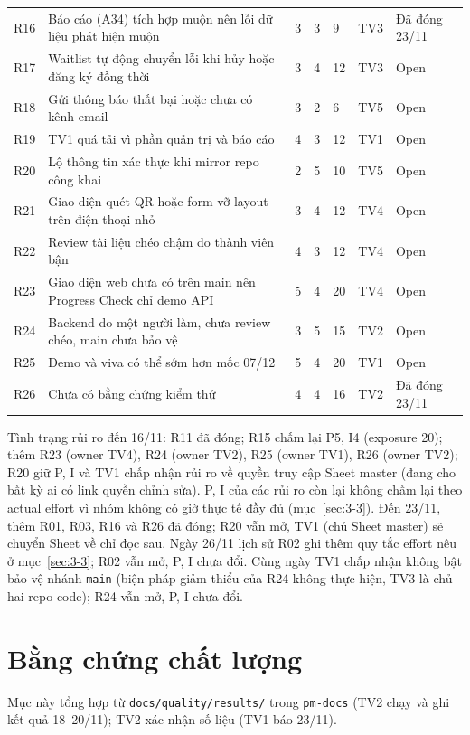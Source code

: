 \begin{longtable}{L{0.9cm}L{6.4cm}L{0.6cm}L{0.6cm}L{1.0cm}L{1.4cm}L{3.0cm}}
R16 & Báo cáo (A34) tích hợp muộn nên lỗi dữ liệu phát hiện muộn & 3 & 3 & 9 & TV3 & Đã đóng 23/11 \\
R17 & Waitlist tự động chuyển lỗi khi hủy hoặc đăng ký đồng thời & 3 & 4 & 12 & TV3 & Open \\
R18 & Gửi thông báo thất bại hoặc chưa có kênh email & 3 & 2 & 6 & TV5 & Open \\
R19 & TV1 quá tải vì phần quản trị và báo cáo & 4 & 3 & 12 & TV1 & Open \\
R20 & Lộ thông tin xác thực khi mirror repo công khai & 2 & 5 & 10 & TV5 & Open \\
R21 & Giao diện quét QR hoặc form vỡ layout trên điện thoại nhỏ & 3 & 4 & 12 & TV4 & Open \\
R22 & Review tài liệu chéo chậm do thành viên bận & 4 & 3 & 12 & TV4 & Open \\
R23 & Giao diện web chưa có trên main nên Progress Check chỉ demo API & 5 & 4 & 20 & TV4 & Open \\
R24 & Backend do một người làm, chưa review chéo, main chưa bảo vệ & 3 & 5 & 15 & TV2 & Open \\
R25 & Demo và viva có thể sớm hơn mốc 07/12 & 5 & 4 & 20 & TV1 & Open \\
R26 & Chưa có bằng chứng kiểm thử & 4 & 4 & 16 & TV2 & Đã đóng 23/11 \\
\end{longtable}
\endgroup

Tình trạng rủi ro đến 16/11: R11 đã đóng; R15 chấm lại P5, I4 (exposure 20); thêm R23 (owner TV4), R24 (owner TV2), R25 (owner TV1), R26 (owner TV2); R20 giữ P, I và TV1 chấp nhận rủi ro về quyền truy cập Sheet master (đang cho bất kỳ ai có link quyền chỉnh sửa). P, I của các rủi ro còn lại không chấm lại theo actual effort vì nhóm không có giờ thực tế đầy đủ (mục~\ref{sec:3-3}). Đến 23/11, thêm R01, R03, R16 và R26 đã đóng; R20 vẫn mở, TV1 (chủ Sheet master) sẽ chuyển Sheet về chỉ đọc sau. Ngày 26/11 lịch sử R02 ghi thêm quy tắc effort nêu ở mục~\ref{sec:3-3}; R02 vẫn mở, P, I chưa đổi. Cùng ngày TV1 chấp nhận không bật bảo vệ nhánh \texttt{main} (biện pháp giảm thiểu của R24 không thực hiện, TV3 là chủ hai repo code); R24 vẫn mở, P, I chưa đổi.

\section{Bằng chứng chất lượng}
\label{sec:3-5}

Mục này tổng hợp từ \texttt{docs/\allowbreak quality/\allowbreak results/} trong \texttt{pm-docs} (TV2 chạy và ghi kết quả 18--20/11); TV2 xác nhận số liệu (TV1 báo 23/11).

